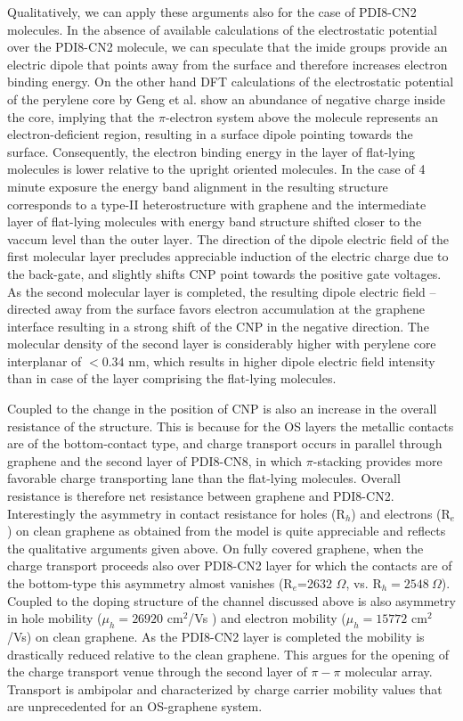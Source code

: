 \documentclass[preprint,aip,jap]{revtex4-2}
\begin{document}
Qualitatively, we can apply these arguments also for the case of PDI8-CN2 molecules. In the absence of available calculations of the electrostatic potential over the PDI8-CN2 molecule, we can speculate that the imide groups provide an electric dipole that points away from the surface and therefore increases electron binding energy. On the other hand DFT calculations of the electrostatic potential of the perylene core by Geng et al.\cite{geng-2012} show an abundance of negative charge inside the core, implying  that the $\pi$-electron system above the molecule represents an electron-deficient region, resulting in a surface dipole pointing towards the surface. Consequently, the electron binding energy in the layer of flat-lying molecules is lower relative to the upright oriented molecules.  In the case of 4 minute exposure the energy band alignment in the resulting structure corresponds to a type-II heterostructure with graphene and the intermediate layer of flat-lying molecules with energy band structure shifted closer to the vaccum level than the outer layer.  The direction of the dipole electric field of the first molecular layer precludes appreciable induction of the electric charge due to the back-gate, and slightly shifts CNP point towards the positive gate voltages. As the second molecular layer is completed, the resulting dipole electric field -- directed away from the surface favors electron accumulation at the graphene interface resulting in a strong shift of the CNP in the negative direction.  The molecular density of the second layer is considerably higher with perylene core interplanar of $< 0.34$ nm, which results in higher dipole electric field intensity than in  case of the layer comprising the flat-lying molecules.

Coupled to the change in the position of CNP is also an increase in the overall resistance of the structure. This is because for the OS layers the metallic contacts are of the  bottom-contact type, and charge transport occurs in parallel through graphene and the second layer of PDI8-CN8, in which $\pi$-stacking provides more favorable charge transporting lane than the flat-lying molecules. Overall resistance is therefore net resistance between graphene and PDI8-CN2. Interestingly the asymmetry in contact resistance for holes (R$_{h}$) and  electrons  (R$_{e}$) on clean graphene as obtained from the model is quite appreciable and reflects the qualitative arguments given above.  On fully covered graphene, when the charge transport proceeds also over PDI8-CN2 layer for which the contacts are of the bottom-type this asymmetry almost vanishes (R$_{e}$=2632 $\Omega$, vs. R$_{h}=2548\ \Omega$).  Coupled to the doping structure of the channel discussed above is also asymmetry in hole mobility  ($\mu_{h}= 26920$ cm$^{2}$/Vs ) and electron mobility ($\mu_{h}= 15772$ cm$^{2}$/Vs) on clean graphene. As the PDI8-CN2 layer is completed the mobility is drastically reduced relative to the clean graphene.  This argues for the opening of the charge transport venue through the second layer of $\pi-\pi$ molecular array. Transport is ambipolar and characterized by charge carrier mobility values that are unprecedented for an OS-graphene system.  
\end{document}
